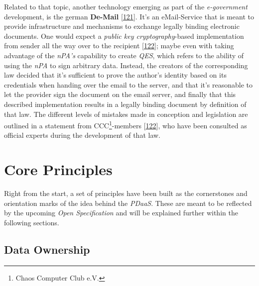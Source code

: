 \documentclass[12pt,english,a4paper,titlepage,cleardoublepage=empty,dottedtoc]{report}
\begin{document}
Related to that topic, another technology emerging as part of the
\emph{e-government} development, is the german
\textbf{\protect\hypertarget{def--de-mail}{}{De-Mail}}
{[}\protect\hyperlink{ref-web_2017_about-de-mail}{121}{]}. It's an
eMail-Service that is meant to provide infrastructure and mechanisms to
exchange legally binding electronic documents. One would expect a
\emph{public key cryptography}-based implementation from sender all the
way over to the recipient
{[}\protect\hyperlink{ref-statement_2013_de-mail}{122}{]}; maybe even
with taking advantage of the \emph{nPA's} capability to create
\emph{QES}, which refers to the ability of using the \emph{nPA} to sign
arbitrary data. Instead, the creators of the corresponding law decided
that it's sufficient to prove the author's identity based on its
credentials when handing over the email to the server, and that it's
reasonable to let the provider sign the document on the email server,
and finally that this described implementation results in a legally
binding document by definition of that law. The different levels of
mistakes made in conception and legislation are outlined in a statement
from CCC\footnote{Chaos Computer Club e.V.}-members
{[}\protect\hyperlink{ref-statement_2013_de-mail}{122}{]}, who have been
consulted as official experts during the development of that law.

\hypertarget{core-principles}{\chapter{Core
Principles}\label{core-principles}}

Right from the start, a set of principles have been built as the
cornerstones and orientation marks of the idea behind the \emph{PDaaS}.
These are meant to be reflected by the upcoming \emph{Open
Specification} and will be explained further within the following
sections.

\section{Data Ownership}\label{data-ownership}
\end{document}
